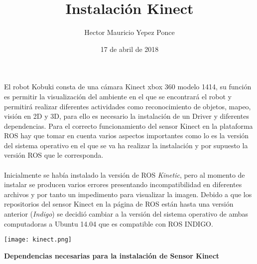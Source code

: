 \documentclass[12pt,a4paper]{article}
\author{Hector Mauricio Yepez Ponce}
\date{17 de abril de 2018}
\title{Instalación Kinect}
\begin{document}
\maketitle
El robot Kobuki consta de una cámara Kinect xbox 360 modelo 1414, su función es permitir la visualización del ambiente en el que se encontrará el robot y permitirá realizar diferentes actividades como reconocimiento de objetos, mapeo, visión en 2D y 3D, para ello es necesario la instalación de un Driver y diferentes dependencias.
Para el correcto funcionamiento del sensor Kinect en la plataforma ROS hay que tomar en cuenta varios aspectos importantes como lo es la versión del sistema operativo en el que se va ha realizar la instalación y por supuesto la versión ROS que le corresponda. \\\\
Inicialmente se había instalado la versión de ROS \textit{Kinetic}, pero al momento de instalar se producen varios errores presentando incompatibilidad en diferentes archivos y por tanto un impedimento para visualizar la imagen. Debido a que los repositorios del sensor Kinect en la página de ROS están hasta una versión anterior (\textit{Indigo}) se decidió cambiar a la versión del sistema operativo de ambas computadoras a Ubuntu 14.04 que es compatible con ROS INDIGO.
\begin{center}
\texttt{[image: kinect.png]}
\end{center}

\begin{center}
\textbf{Dependencias necesarias para la instalación de Sensor Kinect}
\end{center}
\end{document}
